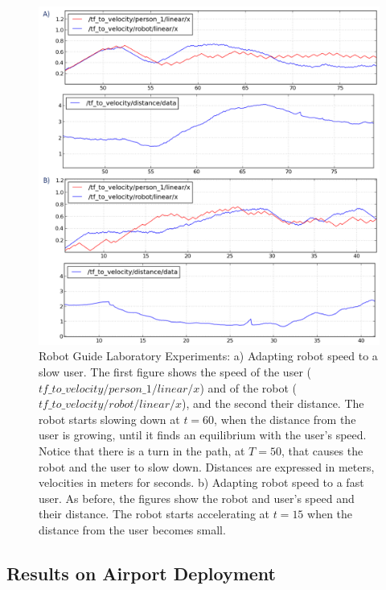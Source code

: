 \begin{figure}[ht!]
	\centering
	\includegraphics[scale=0.5]{img/case_study/spencer/experiments.png}
	\caption[Robot Guide laboratory experiment]{Robot Guide Laboratory Experiments: a) Adapting robot speed to a slow user. The first figure shows the speed of the user ($tf\_to\_velocity/person\_1/linear/x$) and of the robot ($tf\_to\_velocity/robot/linear/x$), and the second their distance. The robot starts slowing down at $t=60$, when the distance from the user is growing, until it finds an equilibrium with the user's speed. Notice that there is a turn in the path, at $T=50$, that causes the robot and the user to slow down. Distances are expressed in meters, velocities in meters for seconds.
b) Adapting robot speed to a fast user. As before, the figures show the robot and user's speed and their distance. The robot starts accelerating at $t=15$  when the distance from the user becomes small.}
	\label{fig:case_study-spencer-exp_lab_result}
\end{figure}

\subsection{Results on Airport Deployment}
\label{subsec:case_study-spencer-airport}
